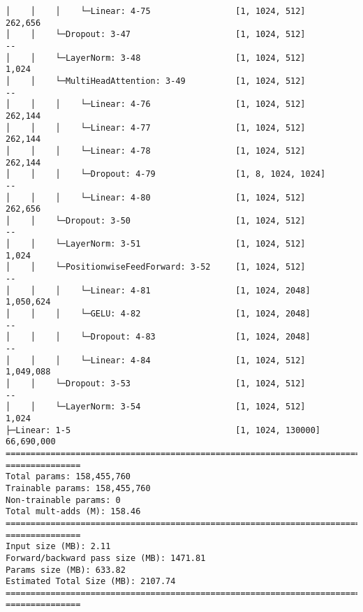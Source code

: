 \documentclass[12pt]{article}
\begin{document}
\begin{Verbatim}[commandchars=\\\{\}]
│    │    │    └─Linear: 4-75                 [1, 1024, 512]            262,656
│    │    └─Dropout: 3-47                     [1, 1024, 512]            --
│    │    └─LayerNorm: 3-48                   [1, 1024, 512]            1,024
│    │    └─MultiHeadAttention: 3-49          [1, 1024, 512]            --
│    │    │    └─Linear: 4-76                 [1, 1024, 512]            262,144
│    │    │    └─Linear: 4-77                 [1, 1024, 512]            262,144
│    │    │    └─Linear: 4-78                 [1, 1024, 512]            262,144
│    │    │    └─Dropout: 4-79                [1, 8, 1024, 1024]        --
│    │    │    └─Linear: 4-80                 [1, 1024, 512]            262,656
│    │    └─Dropout: 3-50                     [1, 1024, 512]            --
│    │    └─LayerNorm: 3-51                   [1, 1024, 512]            1,024
│    │    └─PositionwiseFeedForward: 3-52     [1, 1024, 512]            --
│    │    │    └─Linear: 4-81                 [1, 1024, 2048]
1,050,624
│    │    │    └─GELU: 4-82                   [1, 1024, 2048]           --
│    │    │    └─Dropout: 4-83                [1, 1024, 2048]           --
│    │    │    └─Linear: 4-84                 [1, 1024, 512]
1,049,088
│    │    └─Dropout: 3-53                     [1, 1024, 512]            --
│    │    └─LayerNorm: 3-54                   [1, 1024, 512]            1,024
├─Linear: 1-5                                 [1, 1024, 130000]
66,690,000
================================================================================
===============
Total params: 158,455,760
Trainable params: 158,455,760
Non-trainable params: 0
Total mult-adds (M): 158.46
================================================================================
===============
Input size (MB): 2.11
Forward/backward pass size (MB): 1471.81
Params size (MB): 633.82
Estimated Total Size (MB): 2107.74
================================================================================
===============
    \end{Verbatim}


    
    
    
\end{document}
